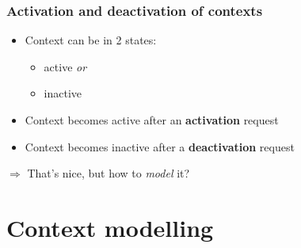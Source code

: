 \documentclass{beamer}
\begin{document}
\begin{frame}
	\frametitle{Activation and deactivation of contexts}
	\begin{itemize}
		\item Context can be in 2 states:
		\begin{itemize}
			\item active \textit{or}
			\item inactive
		\end{itemize}
		\item Context becomes active after an \textbf{activation} request
		\item Context becomes inactive after a \textbf{deactivation} request
	\end{itemize}
	\bigskip

	\pause
	$\Rightarrow$ That's nice, but how to \textit{model} it?
\end{frame}

\section{Context modelling}
\end{document}
